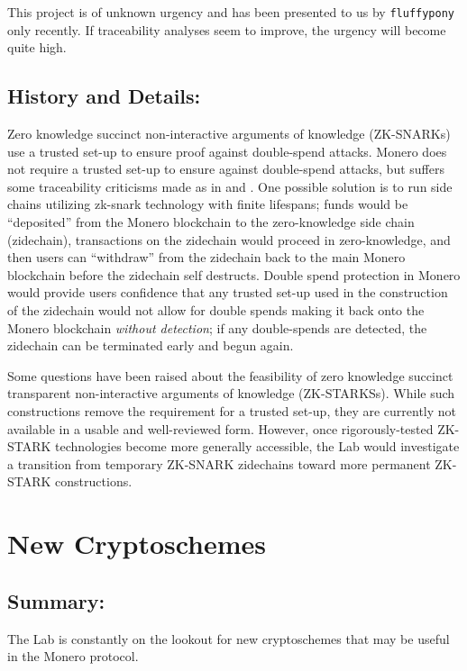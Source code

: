 \documentclass[12pt,english]{mrl}
\theoremstyle{definition}
\numberwithin{equation}{section}
\numberwithin{figure}{section}
\numberwithin{equation}{section}
\numberwithin{equation}{section}
\numberwithin{figure}{section}
\begin{document}
This project is of unknown urgency and has been presented to us by \texttt{fluffypony} only recently. If traceability analyses seem to improve, the urgency will become quite high.

\subsection{History and Details:} 

Zero knowledge succinct non-interactive arguments of knowledge (ZK-SNARKs) use a trusted set-up to ensure proof against double-spend attacks. Monero does not require a trusted set-up to ensure against double-spend attacks, but suffers some traceability criticisms made as in \cite{miller2017empirical} and \cite{kumar2017traceability}. One possible solution is to run side chains utilizing zk-snark technology with finite lifespans; funds would be ``deposited'' from the Monero blockchain to the zero-knowledge side chain (zidechain), transactions on the zidechain would proceed in zero-knowledge, and then users can ``withdraw'' from the zidechain back to the main Monero blockchain before the zidechain self destructs. Double spend protection in Monero would provide users confidence that any trusted set-up used in the construction of the zidechain would not allow for double spends making it back onto the Monero blockchain \textit{without detection}; if any double-spends are detected, the zidechain can be terminated early and begun again.

Some questions have been raised about the feasibility of zero knowledge succinct transparent non-interactive arguments of knowledge (ZK-STARKSs). While such constructions remove the requirement for a trusted set-up, they are currently not available in a usable and well-reviewed form. However, once rigorously-tested ZK-STARK technologies become more generally accessible, the Lab would investigate a transition from temporary ZK-SNARK zidechains toward more permanent ZK-STARK constructions.



\section{New Cryptoschemes}


\subsection{Summary:} 

The Lab is constantly on the lookout for new cryptoschemes that may be useful in the Monero protocol.
\end{document}
